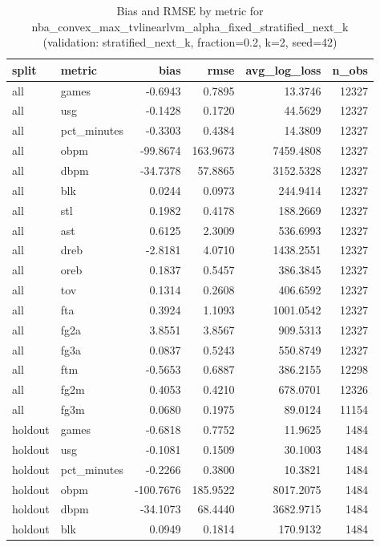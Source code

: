 \begin{table}
\caption{Bias and RMSE by metric for nba_convex_max_tvlinearlvm_alpha_fixed_stratified_next_k (validation: stratified_next_k, fraction=0.2, k=2, seed=42)}
\label{tab:nba_convex_max_tvlinearlvm_alpha_fixed_stratified_next_k_vs_stratified_next_k_f20_k2_s42_bias_rmse}
\begin{tabular}{llrrrr}
\toprule
split & metric & bias & rmse & avg\_log\_loss & n\_obs \\
\midrule
all & games & -0.6943 & 0.7895 & 13.3746 & 12327 \\
all & usg & -0.1428 & 0.1720 & 44.5629 & 12327 \\
all & pct\_minutes & -0.3303 & 0.4384 & 14.3809 & 12327 \\
all & obpm & -99.8674 & 163.9673 & 7459.4808 & 12327 \\
all & dbpm & -34.7378 & 57.8865 & 3152.5328 & 12327 \\
all & blk & 0.0244 & 0.0973 & 244.9414 & 12327 \\
all & stl & 0.1982 & 0.4178 & 188.2669 & 12327 \\
all & ast & 0.6125 & 2.3009 & 536.6993 & 12327 \\
all & dreb & -2.8181 & 4.0710 & 1438.2551 & 12327 \\
all & oreb & 0.1837 & 0.5457 & 386.3845 & 12327 \\
all & tov & 0.1314 & 0.2608 & 406.6592 & 12327 \\
all & fta & 0.3924 & 1.1093 & 1001.0542 & 12327 \\
all & fg2a & 3.8551 & 3.8567 & 909.5313 & 12327 \\
all & fg3a & 0.0837 & 0.5243 & 550.8749 & 12327 \\
all & ftm & -0.5653 & 0.6887 & 386.2155 & 12298 \\
all & fg2m & 0.4053 & 0.4210 & 678.0701 & 12326 \\
all & fg3m & 0.0680 & 0.1975 & 89.0124 & 11154 \\
holdout & games & -0.6818 & 0.7752 & 11.9625 & 1484 \\
holdout & usg & -0.1081 & 0.1509 & 30.1003 & 1484 \\
holdout & pct\_minutes & -0.2266 & 0.3800 & 10.3821 & 1484 \\
holdout & obpm & -100.7676 & 185.9522 & 8017.2075 & 1484 \\
holdout & dbpm & -34.1073 & 68.4440 & 3682.9715 & 1484 \\
holdout & blk & 0.0949 & 0.1814 & 170.9132 & 1484 \\

\end{tabular}
\end{table}
